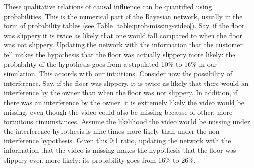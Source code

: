 \documentclass[
  10pt,
  dvipsnames,enabledeprecatedfontcommands]{scrartcl}
\begin{document}
These qualitative relations of causal influence can be quantified using
probabilities. This is the numerical part of the Bayesian network,
usually in the form of probability tables (see Table
\ref{table:prob-missing-video}). Say, if the floor was slippery it is
twice as likely that one would fall compared to when the floor was not
slippery. Updating the network with the information that the customer
fell makes the hypothesis that the floor was actually slippery more
likely: the probability of the hypothesis goes from a stipulated 10\% to
16\% in our simulation. This accords with our intuitions. Consider now
the possibility of interference. Say, if the floor was slippery, it is
twice as likely that there would an interference by the owner than when
the floor was not slippery. In addition, if there was an interference by
the owner, it is extremely likely the video would be missing, even
though the video could also be missing because of other, more fortuitous
circumstances. Assume the likelihood the video would be missing under
the interference hypothesis is nine times more likely than under the
non-interference hypothesis. Given this 9:1 ratio, updating the network
with the information that the video is missing makes the hypothesis that
the floor was slippery even more likely: its probability goes from 16\%
to 26\%.
\end{document}

